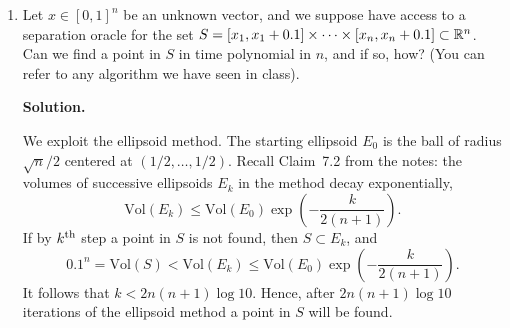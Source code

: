 \documentclass[12pt]{article}
\begin{document}
\begin{enumerate}
\newpage

\item Let $x \in [0,1]^n$ be an unknown vector, and we suppose have access to a separation oracle for the set $S = [x_1, x_1 + 0.1] \times  \dots \times [x_n, x_n + 0.1] \subset {\mathbb R}^n$. Can we find a point in $S$ in time polynomial in $n$, and if so, how? (You can refer to any algorithm we have seen in class).
    
\textbf{Solution.} 

We exploit the ellipsoid method. The starting ellipsoid $E_0$ is the ball of radius $\sqrt{n}/2$ centered at $(1/2, \ldots, 1/2)$. Recall Claim~7.2 from the notes: the volumes of successive ellipsoids $E_k$ in the method decay exponentially,
\[
\mbox{Vol}(E_k) \le \mbox{Vol}(E_0) \exp \left( -\frac{k}{2(n+1)}\right).
\]
If by $k\textsuperscript{th}$ step a point in $S$ is not found, then $S \subset E_k$, and
\[
0.1^n = \mbox{Vol}(S) < \mbox{Vol}(E_k) \le \mbox{Vol}(E_0) \exp \left( -\frac{k}{2(n+1)}\right).
\]
It follows that $k < 2 n(n+1) \log 10$. Hence, after $2 n(n+1) \log 10$ iterations of the ellipsoid method a point in $S$ will be found.









\end{enumerate}

\end{document}
